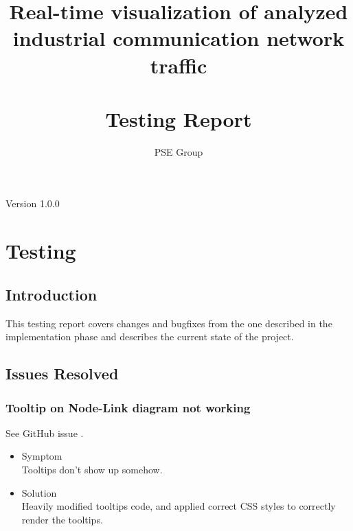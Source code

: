 \documentclass[oneside, english, final]{design}
\author{PSE Group}
\title{Real-time visualization of analyzed industrial communication network traffic\\ \hfill \\Testing Report}
\begin{document}
\nocite{*}

\setpdf

\maketitle


\hfill

\begin{center}
      \large{Version 1.0.0}
\end{center}


\thispagestyle{empty}
\begin{abstract}
      \thispagestyle{empty}
\end{abstract}

\thispagestyle{empty}
\newpage
\thispagestyle{empty}
\tableofcontents
\cleardoublepage
\setcounter{page}{1}


\section{Testing}\label{sec:intro}
\subsection{Introduction}

This testing report covers changes and bugfixes from the one described in the implementation phase
and describes the current state of the project.

\subsection{Issues Resolved}

\subsubsection{Tooltip on Node-Link diagram not working}

See GitHub issue \href{https://github.com/DHSTTOS/implementation/issues/69}{\color{blue}{\#69}}.

\begin{itemize}
      \item{Symptom
            \\
            Tooltips don't show up somehow.}

      \item{Solution
            \\
            Heavily modified tooltips code, and applied correct CSS styles to correctly render the tooltips.}
\end{itemize}
\end{document}

